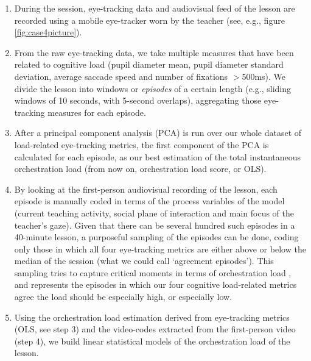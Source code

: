 \documentclass[10pt,journal,compsoc]{IEEEtran}
\begin{document}
\begin{enumerate}
\item During the session, eye-tracking data and audiovisual feed of the lesson are recorded using a mobile eye-tracker worn by the teacher (see, e.g., figure \ref{fig:case4picture}).
\item From the raw eye-tracking data, we take multiple measures that have been related to cognitive load (pupil diameter mean, pupil diameter standard deviation, average saccade speed and number of fixations $>$500ms). We divide the lesson into windows or \textit{episodes} of a certain length (e.g., sliding windows of 10 seconds, with 5-second overlaps), aggregating those eye-tracking measures for each episode.
\item After a principal component analysis (PCA) is run over our whole dataset of load-related eye-tracking metrics, the first component of the PCA is calculated for each episode, as our best estimation of the total instantaneous orchestration load (from now on, orchestration load score, or OLS). %
\item By looking at the first-person audiovisual recording of the lesson, each episode is manually coded in terms of the process variables of the model (current teaching activity, social plane of interaction and main focus of the teacher's gaze). Given that there can be several hundred such episodes in a 40-minute lesson, a purposeful sampling of the episodes can be done, coding only those in which all four eye-tracking metrics are either above or below the median of the session (what we could call `agreement episodes'). This sampling tries to capture critical moments in terms of orchestration load \cite{Prieto2014}, and represents the episodes in which our four cognitive load-related metrics agree the load should be especially high, or especially low. %
\item Using the orchestration load estimation derived from eye-tracking metrics (OLS, see step 3) and the video-codes extracted from the first-person video (step 4), we build linear statistical models of the orchestration load of the lesson. 
\end{enumerate}
\end{document}
